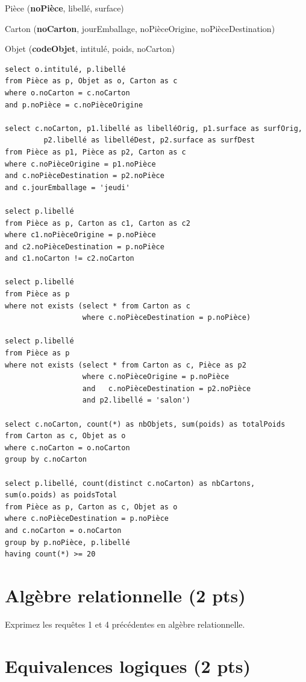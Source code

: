 \begin{solution}
Pièce (\textbf{noPièce}, libellé, surface)

Carton (\textbf{noCarton}, jourEmballage, noPièceOrigine,
                            noPièceDestination)

Objet (\textbf{codeObjet}, intitulé, poids,
                     noCarton)

\begin{verbatim}
select o.intitulé, p.libellé
from Pièce as p, Objet as o, Carton as c
where o.noCarton = c.noCarton
and p.noPièce = c.noPièceOrigine

select c.noCarton, p1.libellé as libelléOrig, p1.surface as surfOrig,
         p2.libellé as libelléDest, p2.surface as surfDest
from Pièce as p1, Pièce as p2, Carton as c
where c.noPièceOrigine = p1.noPièce
and c.noPièceDestination = p2.noPièce
and c.jourEmballage = 'jeudi'

select p.libellé
from Pièce as p, Carton as c1, Carton as c2
where c1.noPièceOrigine = p.noPièce
and c2.noPièceDestination = p.noPièce
and c1.noCarton != c2.noCarton

select p.libellé
from Pièce as p
where not exists (select * from Carton as c
                  where c.noPièceDestination = p.noPièce)

select p.libellé
from Pièce as p
where not exists (select * from Carton as c, Pièce as p2
                  where c.noPièceOrigine = p.noPièce
                  and   c.noPièceDestination = p2.noPièce
                  and p2.libellé = 'salon')

select c.noCarton, count(*) as nbObjets, sum(poids) as totalPoids
from Carton as c, Objet as o
where c.noCarton = o.noCarton
group by c.noCarton

select p.libellé, count(distinct c.noCarton) as nbCartons, sum(o.poids) as poidsTotal
from Pièce as p, Carton as c, Objet as o
where c.noPièceDestination = p.noPièce
and c.noCarton = o.noCarton
group by p.noPièce, p.libellé
having count(*) >= 20
\end{verbatim}
\end{solution}


\section{Algèbre relationnelle ({\bf 2 pts})}

Exprimez les requêtes 1 et 4 précédentes
en algèbre relationnelle.


\section{Equivalences logiques ({\bf 2 pts})}

